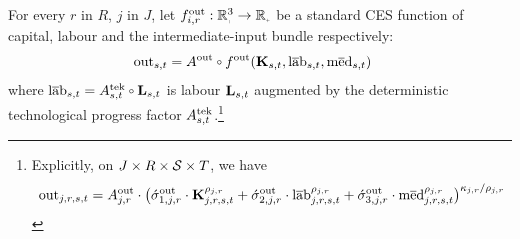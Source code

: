 \documentclass[12pt,a4paper,twoside, draft]{article}
\begin{document}
For every $r$ in $R$, $j$ in $J$, let
$f_{i, r}^{\textup{out}}: \nnreal^{3} \rightarrow \nnreal$ be a standard
CES function of capital, labour and the intermediate-input bundle %
respectively:
\begin{align}
	\textup{out}_{\node, t}
    &= A^{\textup{out}} \ccirc f ^ \textup{out}(
        \mathbf{K}_{\node, t},
        \lab_{\node, t},
        \med_{\node, t}
        )
\end{align}
where $\lab_{\node, t} =
  A_{\node, t}^{\textup{tek}} \ccirc \mathbf{L}_{\node, t}$ is labour
$\mathbf{L}_{{s}, t}$ augmented by the deterministic technological progress
factor $A_{{s}, t}^{\textup{tek}}$.\footnote{
  Explicitly, on $J \times R \times \mathcal{S} \times T$, we have
  \begin{align*}
    \textup{out}_{j, r, {s}, t} =
        A_{j, r}^{\textup{out}} \cdot \left(
        \acute{\sigma}_{1, j, r}^{\textup{out}} \cdot \mathbf{K}_{j, r, {s}, t}
          ^{\rho_{j, r}}
        + \acute{\sigma}_{2, j, r}^{\textup{out}} \cdot \textup{l}\overline{\textup{a}}\textup{b}_{j, r, {s}, t}
          ^{\rho_{j, r}}
        + \acute{\sigma}_{3, j, r}^{\textup{out}} \cdot \textup{m}\overline{\textup{e}}\textup{d}_{j, r, {s}, t}
          ^{\rho_{j, r}}
      \right) ^ {\kappa_{j, r} / \rho_{j, r}}
  \end{align*}
}
\end{document}
